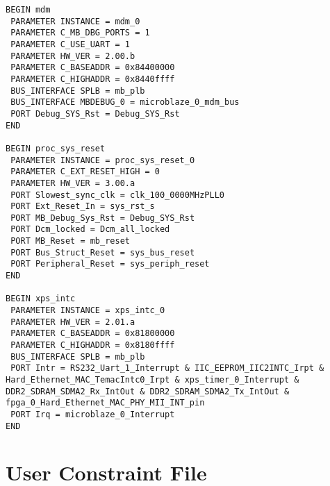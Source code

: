\begin{verbatim}
BEGIN mdm
 PARAMETER INSTANCE = mdm_0
 PARAMETER C_MB_DBG_PORTS = 1
 PARAMETER C_USE_UART = 1
 PARAMETER HW_VER = 2.00.b
 PARAMETER C_BASEADDR = 0x84400000
 PARAMETER C_HIGHADDR = 0x8440ffff
 BUS_INTERFACE SPLB = mb_plb
 BUS_INTERFACE MBDEBUG_0 = microblaze_0_mdm_bus
 PORT Debug_SYS_Rst = Debug_SYS_Rst
END

BEGIN proc_sys_reset
 PARAMETER INSTANCE = proc_sys_reset_0
 PARAMETER C_EXT_RESET_HIGH = 0
 PARAMETER HW_VER = 3.00.a
 PORT Slowest_sync_clk = clk_100_0000MHzPLL0
 PORT Ext_Reset_In = sys_rst_s
 PORT MB_Debug_Sys_Rst = Debug_SYS_Rst
 PORT Dcm_locked = Dcm_all_locked
 PORT MB_Reset = mb_reset
 PORT Bus_Struct_Reset = sys_bus_reset
 PORT Peripheral_Reset = sys_periph_reset
END

BEGIN xps_intc
 PARAMETER INSTANCE = xps_intc_0
 PARAMETER HW_VER = 2.01.a
 PARAMETER C_BASEADDR = 0x81800000
 PARAMETER C_HIGHADDR = 0x8180ffff
 BUS_INTERFACE SPLB = mb_plb
 PORT Intr = RS232_Uart_1_Interrupt & IIC_EEPROM_IIC2INTC_Irpt & Hard_Ethernet_MAC_TemacIntc0_Irpt & xps_timer_0_Interrupt & DDR2_SDRAM_SDMA2_Rx_IntOut & DDR2_SDRAM_SDMA2_Tx_IntOut & fpga_0_Hard_Ethernet_MAC_PHY_MII_INT_pin
 PORT Irq = microblaze_0_Interrupt
END
\end{verbatim}

\section{User Constraint File}

